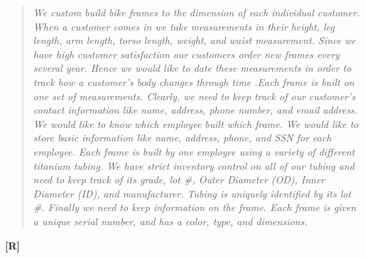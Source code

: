 \begin{enumerate}
\begin{quote}
\emph{We custom build bike frames to the dimension of each individual
customer. When a customer comes in we take measurements in their height,
leg length, arm length, torso length, weight, and waist measurement.
Since we have high customer satisfaction our customers order new frames
every several year. Hence we would like to date these measurements in
order to track how a customer's body changes through time .Each frame is
built on one set of measurements. Clearly, we need to keep track of our
customer's contact information like name, address, phone number, and
email address. We would like to know which employee built which frame.
We would like to store basic information like name, address, phone, and
SSN for each employee. Each frame is built by one employee using a
variety of different titanium tubing. We have strict inventory control
on all of our tubing and need to keep track of its grade, lot \#, Outer
Diameter (OD), Inner Diameter (ID), and manufacturer. Tubing is uniquely
identified by its lot \#. Finally we need to keep information on the
frame. Each frame is given a unique serial number, and has a color,
type, and dimensions.}
\end{quote}

\begin{onlysolution}
  \textbf{[R]}
  \itshape


\end{onlysolution}
\end{enumerate}
